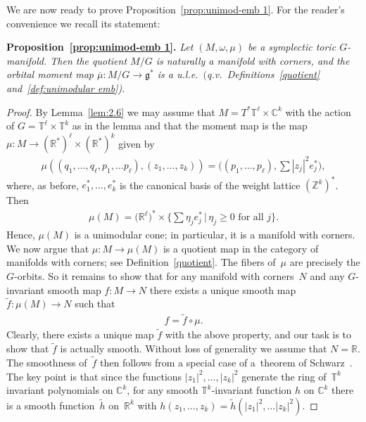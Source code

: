 \documentclass[pdftex]{sigma}
\numberwithin{equation}{section}
\begin{document}
We are now ready to prove Proposition~\ref{prop:unimod-emb 1}. For the
reader's convenience we recall
its statement:

\medskip

\noindent
{\bf Proposition~\ref{prop:unimod-emb 1}.} {\em
Let $(M, \omega, \mu)$ be a symplectic toric $G$-manifold.
Then the quotient $M/G$ is naturally a manifold with corners,
and the orbital moment map $\overline{\mu} \colon M/G\to {\mathfrak g}^*$ is a u.l.e.\
$($q.v.\ Definitions~{\rm \ref{quotient}} and~{\rm \ref{def:unimodular emb})}.}

\medskip

\begin{proof}%
  By Lemma~\ref{lem:2.6} we may assume %
  that $M = T^* {\mathbb T}^\ell \times {\mathbb C}^k$ with the action of $G = {\mathbb T}^\ell
  \times {\mathbb T}^k$ as in the lemma
  and that the moment map is the map $\mu \colon M \to ({\mathbb R}^*)^\ell
  \times ({\mathbb R}^*)^k$ given by
\begin{gather*}
\mu ((q_1, \ldots, q_\ell, p_1, \ldots p_\ell), (z_1,\ldots, z_k))
  =   \Big(   (p_1,\ldots, p_\ell)   ,   \sum |z_j|^2 e_j^*   \Big)   ,
\end{gather*}
where, as before, $e_1^*,\ldots,e_k^*$ is the canonical basis
of the weight lattice $({\mathbb Z}^k)^*$.
Then
\begin{gather*}
 \mu(M) = \big({\mathbb R}^\ell\big)^*   \times
           \Big\{   \sum \eta_j e_j^* \, | \,
             \eta_j \geq 0 \text{ for all $j$} \Big\}.
\end{gather*}
Hence, $\mu(M)$ is a unimodular cone; in particular, it is a manifold
with corners.
We now argue that $\mu \colon M \to \mu(M)$ is a quotient map
in the category of manifolds with corners; see Def\/inition~\ref{quotient}.
The f\/ibers of~$\mu$ are precisely the $G$-orbits.
So it remains to show that for any manifold with corners~$N$
and any $G$-invariant smooth map $f \colon M \to N$
there exists a unique smooth map
$\tilde{f} \colon \mu(M)\to N$ such that
\begin{gather*}
f = \tilde{f} \circ \mu.
\end{gather*}
Clearly, there exists a unique map $\tilde{f}$ with the above property,
and our task is to show that $\tilde{f}$ is actually smooth.
Without loss of generality we assume that $N = {\mathbb R}$.
The smoothness of~$\tilde{f}$ then follows from a special case of a~theorem of Schwarz~\cite{sc:sm}. The key point is that since the
functions $ |z_1|^2, \ldots, |z_k|^2$ generate the ring of~$ {\mathbb T}^k$
invariant polynomials on ${\mathbb C}^k$, for any smooth ${\mathbb T}^k$-invariant
function $h$ on ${\mathbb C}^k$ there is a smooth function~$\tilde{h} $ on~${\mathbb R}^k$ with $h (z_1, \ldots, z_k) = \tilde{h} (|z_1|^2,\ldots |z_k|^2)$.
\end{proof}
\end{document}

